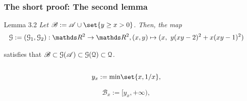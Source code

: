 \documentclass{beamer}
\begin{document}
\begin{frame}
\frametitle{The short proof: The second lemma}

\begin{block}{Lemma 3.2}
\em Let $\mathscr{B}:=\mathscr{A}\cup\set{y\ge x>0}$. Then, the map \vspace{-0.2cm}
$$
\GG:=(\GG_1,\GG_2):\R^2\to\R^2,(x,y)\mapsto (x,\ y(xy-2)^2+x(xy-1)^2)
$$ \vspace{-0.7cm}

satisfies that $\mathscr{B}\subset\mathcal{G}(\mathscr{A})\subset\mathcal{G}(\mathcal{Q})\subset\mathcal{Q}$. \em 
\end{block}

\begin{columns}
\begin{column}{0.5\textwidth}

$$
y_x:=\text{min}\set{x,1/x},
$$

$$
\mathscr{B}_x:=[y_x,+\infty),
$$


\end{column}
\end{columns}
\end{frame}
\end{document}
